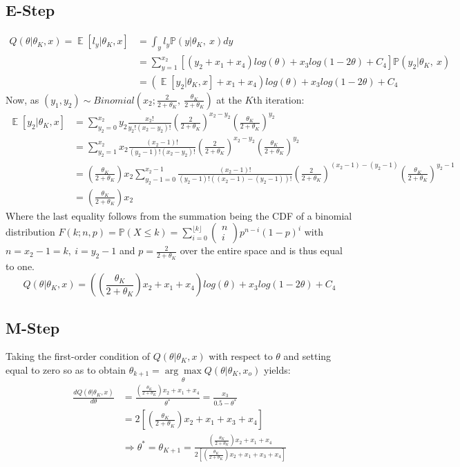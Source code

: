 \documentclass[12pt]{article}
\newcommand{\Prob}{\mathbb{P}}
\newcommand{\RA}{\Rightarrow}
\DeclareMathOperator{\EX}{\mathbb{E}}%
\begin{document}
	\subsection*{E-Step}
		\begin{align*}
			Q(\theta|\theta_K,x) = \EX[l_y|\theta_K, x] &=\int_{y}l_y \Prob(y|\theta_K,\ x) dy \\
			&= \sum_{y=1}^{x_2} [(y_2+x_1+x_4)log(\theta)+x_3log(1-2\theta)+C_4]\Prob(y_2|\theta_K,\ x)\\
			&=(\EX[y_2|\theta_K,x]+x_1+x_4)log(\theta)+x_3log(1-2\theta) + C_4
		\end{align*}
		Now, as $ (y_1,y_2)\sim Binomial(x_2; \frac{2}{2+\theta_K},\ \frac{\theta_K}{2+\theta_K}) $ at the $ K $th iteration:
		\begin{align*}
			\EX[y_2|\theta_K,x] &= \sum_{y_2=0}^{x_2} y_2 \frac{x_2!}{y_2!(x_2-y_2)!} \left( \frac{2}{2+\theta_K} \right)^{x_2-y_2} \left( \frac{\theta_K}{2+\theta_K} \right)^{y_2}\\
			&= \sum_{y_2=1}^{x_2} x_2 \frac{(x_2-1)!}{(y_2-1)!(x_2-y_2)!} \left( \frac{2}{2+\theta_K} \right)^{x_2-y_2} \left( \frac{\theta_K}{2+\theta_K} \right)^{y_2} \\
			&= \left( \frac{\theta_K}{2+\theta_K} \right) x_2 \sum_{y_2-1=0}^{x_2-1} \frac{(x_2-1)!}{(y_2-1)!((x_2-1)-(y_2-1))!} \left( \frac{2}{2+\theta_K} \right)^{(x_2-1)-(y_2-1)} \left( \frac{\theta_K}{2+\theta_K} \right)^{y_2-1} \\
			&= \left( \frac{\theta_K}{2+\theta_K} \right) x_2 
		\end{align*}
		Where the last equality follows from the summation being the CDF of a binomial distribution $ F(k;n,p)=\Prob(X\leq k ) =\sum_{i=0}^{\lfloor k\rfloor}\left(\begin{array}{c}{n} \\ {i}\end{array}\right) p^{n-i}(1-p)^{i} $ with $ n=x_2-1=k,\ i=y_2-1 $ and $ p=\frac{2}{2+\theta_K} $ over the entire space and is thus equal to one.
		\[ Q(\theta|\theta_K,x) = \left( \left( \frac{\theta_K}{2+\theta_K} \right) x_2  +x_1+x_4 \right) log(\theta)+x_3log(1-2\theta) + C_4 \]
	 \subsection*{M-Step}
	 	Taking the first-order condition of $  Q(\theta|\theta_K,x) $ with respect to $ \theta $ and setting equal to zero so as to obtain $\theta_{k+1}=\underset{\theta}{\arg \max } Q\left(\theta | \theta_{K}, x_{o}\right)$ yields:
	 	\begin{align*}
	 		\frac{d Q(\theta|\theta_K,x) }{d \theta} &= \frac{ \left( \frac{\theta_K}{2+\theta_K} \right) x_2  +x_1+x_4 }{\theta^*} = \frac{x_3}{0.5-\theta^*}\\
	 		&=  2\left[ \left( \frac{\theta_K}{2+\theta_K} \right) x_2  + x_1 + x_3 + x_4 \right]\\
	 		&\RA \theta^* = \theta_{K+1} = \frac{  \left( \frac{\theta_K}{2+\theta_K} \right) x_2  +x_1+x_4 }{ 2\left[ \left( \frac{\theta_K}{2+\theta_K} \right) x_2  + x_1 + x_3 + x_4 \right] }
	 	\end{align*}
	 
\end{document}
